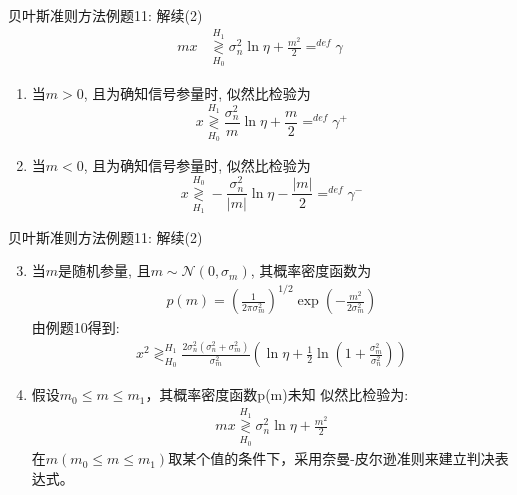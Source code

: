 \begin{frame}[shrink]{贝叶斯准则方法例题11: 解续(2)}
\begin{align*}
mx&\mathop{\gtrless}\limits_{H_0}^{H_1}\sigma_n^2\ln\eta+\frac{m^2}{2}\mathop{=}^{def}\gamma
\end{align*}
\begin{enumerate}
	\item 当$m>0$, 且为确知信号参量时, 似然比检验为
	\[ x\mathop{\gtrless}\limits_{H_0}^{H_1}\frac{\sigma_n^2}{m}\ln\eta+\frac{m}{2}\mathop{=}^{def}\gamma^{+} \]
	\item 当$m<0$, 且为确知信号参量时, 似然比检验为
	\[ x\mathop{\gtrless}\limits_{H_1}^{H_0}-\frac{\sigma_n^2}{|m|}\ln\eta-\frac{|m|}{2}\mathop{=}^{def}\gamma^{-} \]
\end{enumerate} 
\end{frame}

\begin{frame}[shrink]{贝叶斯准则方法例题11: 解续(2)}
\begin{enumerate}
	\setcounter{enumi}{2} %
	\item 当$m$是随机参量, 且$m\sim\mathcal{N}(0, \sigma_m)$, 其概率密度函数为
	\begin{align*}
	p(m)=\left(\frac{1}{2\pi\sigma_m^2}\right)^{1/2}\exp\left(-\frac{m^2}{2\sigma_m^2}\right)
	\end{align*}
	由例题10得到:
	\begin{align*}
	x^2\mathop{\gtrless}_{H_0}^{H_1}\frac{2\sigma_n^2(\sigma_n^2+\sigma_m^2)}{\sigma_m^2}\left(\ln\eta+\frac{1}{2}\ln\left(1+\frac{\sigma_m^2}{\sigma_n^2}\right)\right)
	\end{align*}
	\item 假设$m_0\le m\le m_1$，其概率密度函数p(m)未知
	似然比检验为:
	\begin{align*}
	mx\mathop{\gtrless}\limits_{H_0}^{H_1}\sigma_n^2\ln\eta+\frac{m^2}{2}
	\end{align*}
	在$m(m_0\le m\le m_1)$取某个值的条件下，采用奈曼-皮尔逊准则来建立判决表达式。
\end{enumerate} 
\end{frame}

